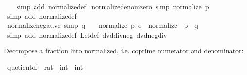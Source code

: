 \begin{isabellebody}
%
\isadelimproof
\ \ %
\endisadelimproof
%
\isatagproof
{}\isamarkupfalse%
\ {\isacharparenleft}{\kern0pt}simp\ add{\isacharcolon}{\kern0pt}\ normalize{\isacharunderscore}{\kern0pt}def{\isacharparenright}{\kern0pt}%
\endisatagproof
{\isafoldproof}%
%
\isadelimproof
\isanewline
%
\endisadelimproof
\isanewline
{}\isamarkupfalse%
\ normalize{\isacharunderscore}{\kern0pt}denom{\isacharunderscore}{\kern0pt}zero\ {\isacharbrackleft}{\kern0pt}simp{\isacharbrackright}{\kern0pt}{\isacharcolon}{\kern0pt}\ {\isachardoublequoteopen}normalize\ {\isacharparenleft}{\kern0pt}p{\isacharcomma}{\kern0pt}\ {}{\isacharparenright}{\kern0pt}\ {\isacharequal}{\kern0pt}\ {\isacharparenleft}{\kern0pt}{}{\isacharcomma}{\kern0pt}\ {}{\isacharparenright}{\kern0pt}{\isachardoublequoteclose}\isanewline
%
\isadelimproof
\ \ %
\endisadelimproof
%
\isatagproof
{}\isamarkupfalse%
\ {\isacharparenleft}{\kern0pt}simp\ add{\isacharcolon}{\kern0pt}\ normalize{\isacharunderscore}{\kern0pt}def{\isacharparenright}{\kern0pt}%
\endisatagproof
{\isafoldproof}%
%
\isadelimproof
\isanewline
%
\endisadelimproof
\isanewline
{}\isamarkupfalse%
\ normalize{\isacharunderscore}{\kern0pt}negative\ {\isacharbrackleft}{\kern0pt}simp{\isacharbrackright}{\kern0pt}{\isacharcolon}{\kern0pt}\ {\isachardoublequoteopen}q\ {\isacharless}{\kern0pt}\ {}\ {\isasymLongrightarrow}\ normalize\ {\isacharparenleft}{\kern0pt}p{\isacharcomma}{\kern0pt}\ q{\isacharparenright}{\kern0pt}\ {\isacharequal}{\kern0pt}\ normalize\ {\isacharparenleft}{\kern0pt}{\isacharminus}{\kern0pt}\ p{\isacharcomma}{\kern0pt}\ {\isacharminus}{\kern0pt}\ q{\isacharparenright}{\kern0pt}{\isachardoublequoteclose}\isanewline
%
\isadelimproof
\ \ %
\endisadelimproof
%
\isatagproof
{}\isamarkupfalse%
\ {\isacharparenleft}{\kern0pt}simp\ add{\isacharcolon}{\kern0pt}\ normalize{\isacharunderscore}{\kern0pt}def\ Let{\isacharunderscore}{\kern0pt}def\ dvd{\isacharunderscore}{\kern0pt}div{\isacharunderscore}{\kern0pt}neg\ dvd{\isacharunderscore}{\kern0pt}neg{\isacharunderscore}{\kern0pt}div{\isacharparenright}{\kern0pt}%
\endisatagproof
{\isafoldproof}%
%
\isadelimproof
%
\endisadelimproof
%
\begin{isamarkuptext}%
Decompose a fraction into normalized, i.e. coprime numerator and denominator:%
\end{isamarkuptext}\isamarkuptrue%
\isamarkupfalse%
\ quotient{\isacharunderscore}{\kern0pt}of\ {\isacharcolon}{\kern0pt}{\isacharcolon}{\kern0pt}\ {\isachardoublequoteopen}rat\ {\isasymRightarrow}\ int\ {\isasymtimes}\ int{\isachardoublequoteclose}\isanewline

\end{isabellebody}
